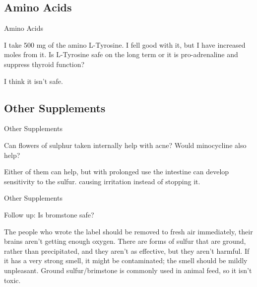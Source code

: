 \documentclass[11pt,oneside,openany,extrafontsizes]{memoir}
\begin{document}
\subsection{Amino Acids}

\begin{qaexchange}{Amino Acids}

    \begin{question}
        I take 500 mg of the amino L-Tyrosine. I fell good with it, but I have increased moles from it. Is L-Tyrosine safe on the long term or it is pro-adrenaline and suppress thyroid function?
    \end{question}

    \begin{answer}
        I think it isn't safe.
    \end{answer}
\end{qaexchange}

\subsection{Other Supplements}

\begin{qaexchange}{Other Supplements}

    \begin{question}
        Can flowers of sulphur taken internally help with acne? Would minocycline also help?
    \end{question}

    \begin{answer}
        Either of them can help, but with prolonged use the intestine can develop sensitivity to the sulfur. causing irritation instead of stopping it.
    \end{answer}
\end{qaexchange}

\begin{qaexchange}{Other Supplements}

    \begin{question}
        Follow up: Is bromstone safe?
    \end{question}

    \begin{answer}
        The people who wrote the label should be removed to fresh air immediately, their brains aren't getting enough oxygen. There are forms of sulfur that are ground, rather than precipitated, and they aren't as effective, but they aren't harmful. If it has a very strong smell, it might be contaminated; the smell should be mildly unpleasant. Ground sulfur/brimstone is commonly used in animal feed, so it isn't toxic.
    \end{answer}
\end{qaexchange}
\end{document}

